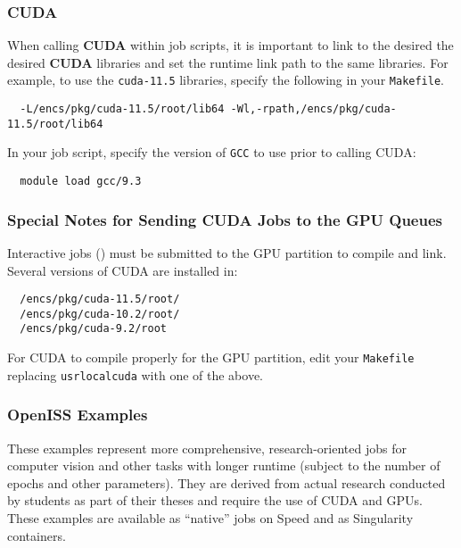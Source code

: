 \subsubsection{CUDA}
\label{sect:cuda}

When calling \textbf{CUDA} within job scripts, it is important to link to the desired
the desired \textbf{CUDA} libraries and set the runtime link path to the same libraries. 
For example, to use the \texttt{cuda-11.5} libraries, specify the following in your \texttt{Makefile}.
\begin{verbatim}
  -L/encs/pkg/cuda-11.5/root/lib64 -Wl,-rpath,/encs/pkg/cuda-11.5/root/lib64
\end{verbatim}

\noindent In your job script, specify the version of \texttt{GCC} to use prior to calling CUDA:
\begin{verbatim}
  module load gcc/9.3
\end{verbatim}

\subsubsection{Special Notes for Sending CUDA Jobs to the GPU Queues}

Interactive jobs () must be submitted to the GPU partition to compile and link.
Several versions of CUDA are installed in:
\begin{verbatim}
  /encs/pkg/cuda-11.5/root/
  /encs/pkg/cuda-10.2/root/
  /encs/pkg/cuda-9.2/root
\end{verbatim}

\noindent For CUDA to compile properly for the GPU partition, edit your \texttt{Makefile}
replacing \texttt{\/usr\/local\/cuda} with one of the above.

\subsubsection{OpenISS Examples}
\label{sect:openiss-examples}

These examples represent more comprehensive, research-oriented jobs for computer vision 
and other tasks with longer runtime (subject to the number of epochs and other parameters).
They are derived from actual research conducted by students as part of their theses and require 
the use of CUDA and GPUs.
These examples are available as ``native'' jobs on Speed and as Singularity containers.

